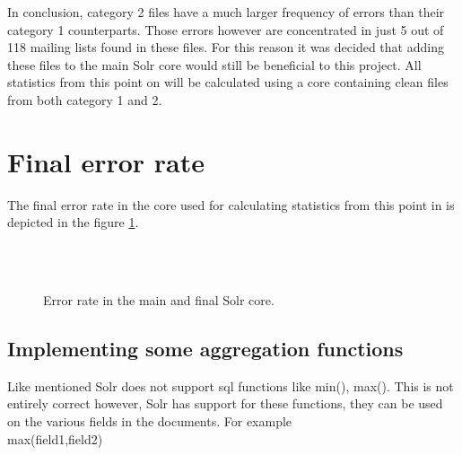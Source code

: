 \documentclass[a4paper,english]{report}
\begin{document}
In conclusion, category 2 files have a much larger frequency of errors than their category 1 counterparts. Those errors however are concentrated in just 5 out of 118 mailing lists found in these files. 
For this reason it was decided that adding these files to the main Solr core would still be beneficial to this project. 
All statistics from this point on will be calculated using a core containing clean files from both category 1 and 2.


\section{Final error rate}


The final error rate in the  core used for calculating statistics from this point in is depicted in the figure \ref{fig:fe}. 

\begin{figure}[H]
\\\\

\caption{Error rate in the main and final Solr core.}

\label{fig:fe}

\end{figure}


\subsection{Implementing some aggregation functions}


Like mentioned Solr does not support sql functions like min(), max(). This is not entirely correct however, Solr has support for these functions, they can be used on the various fields in the documents. 
For example\\ 

max(field1,field2)\\
\end{document}
